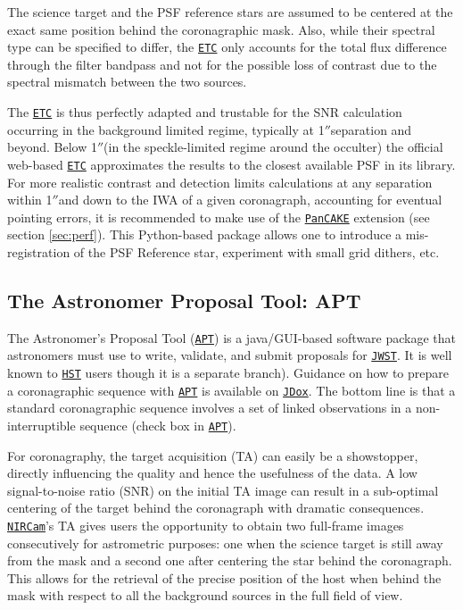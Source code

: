 \documentclass[]{spie}  %
\newcommand{\arcsec}{\mbox{$''$}}
\newcommand{\jwst}{{\tt \href{https://jwst.stsci.edu}{JWST}}\xspace}
\newcommand{\hst}{{\tt \href{https://hst.stsci.edu}{HST}}\xspace}
\newcommand{\nircam}{{\tt \href{https://jwst.stsci.edu/instrumentation/nircam}{NIRCam}}\xspace}
\newcommand{\etc}{{\tt \href{https://jwst.etc.stsci.edu/}{ETC}}\xspace}
\newcommand{\apt}{{\tt \href{http://www.stsci.edu/hst/proposing/apt}{APT}}\xspace}
\newcommand{\pancake}{{\tt \href{https://github.com/spacetelescope/pandeia-coronagraphy}{PanCAKE}}\xspace}
\newcommand{\jdox}{{\tt \href{https://jwst-docs.stsci.edu/}{JDox}}\xspace}
\begin{document}
The science target and the PSF reference stars are assumed to be centered at the exact same position behind the coronagraphic mask. Also, while their spectral type can be specified to differ, the \etc only accounts for the total flux difference through the filter bandpass and not for the possible loss of contrast due to the spectral mismatch between the two sources.

The \etc is thus perfectly adapted and trustable for the SNR calculation occurring in the background limited regime, typically at 1\arcsec separation and beyond. Below 1\arcsec (in the speckle-limited regime around the occulter) the official web-based \etc approximates the results to the closest available PSF in its library. For more realistic contrast and detection limits calculations at any separation within 1\arcsec and down to the IWA of a given coronagraph, accounting for eventual pointing errors, it is recommended to make use of the \pancake extension (see section \ref{sec:perf}). This Python-based package allows one to introduce a mis-registration of the PSF Reference star, experiment with small grid dithers, etc.

\subsection{The Astronomer Proposal Tool: APT}
\label{sec:apt}

The Astronomer's Proposal Tool (\apt) is a java/GUI-based software package that astronomers must use to write, validate, and submit proposals for \jwst. It is well known to \hst users though it is a separate branch). Guidance on how to prepare a coronagraphic sequence with \apt is available on \jdox\cite{jdox_apt}. The bottom line is that a standard coronagraphic sequence involves a set of linked observations in a non-interruptible sequence (check box in \apt).

For coronagraphy, the target acquisition (TA) can easily be a showstopper, directly influencing the quality and hence the usefulness of the data. A low signal-to-noise ratio (SNR) on the initial TA image can result in a sub-optimal centering of the target behind the coronagraph with dramatic consequences.
\nircam's TA gives users the opportunity to obtain two full-frame images consecutively for astrometric purposes: one when the science target is still away from the mask and a second one after centering the star behind the coronagraph. This allows for the retrieval of the precise position of the host when behind the mask with respect to all the background sources in the full field of view. 
\end{document}
